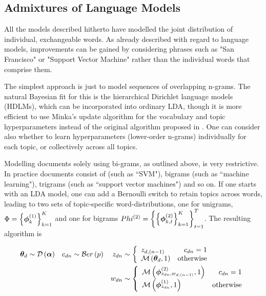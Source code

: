 \subsection*{Admixtures of Language Models}
All the models described hitherto have modelled the joint distribution of individual, exchangeable words. As already described with regard to language models, improvements can be gained by considering phrases such as "San Francisco" or "Support Vector Machine" rather than the individual words that comprise them.

The simplest approach is just to model sequences of overlapping n-grams. The natural Bayesian fit for this is the hierarchical Dirichlet language models (HDLMs), which can be incorporated into ordinary LDA\cite{Wallach2006}, though it is more efficient to use  Minka's update algorithm\cite{Minka2002} for the vocabulary and topic hyperparameters instead of the original algorithm proposed in \cite{MacKay1995}. One can consider also whether to learn hyperparameters (lower-order n-grams) individually for each topic, or collectively across all topics. 

Modelling documents solely using bi-grams, as outlined above, is very restrictive. In practice documents consist of (such as ``SVM"), bigrams (such as ``machine learning"), trigrams (such as ``support vector machines") and so on. If one starts with an LDA model, one can add a Bernoulli switch to retain topics across words, leading to two sets of topic-specific word-distributions, one for unigrams, $\Phi = \left\{ \bm \phi_k^{(1)} \right\}_{k=1}^K$ and one for bigrams $Phi^{(2)} = \left\{\left\{ \bm \phi_{k,t}^{(2)} \right\}_{k=1}^K\right\}_{t=1}^T$. The resulting algorithm is\cite{Wang2007}

\begin{align*}
{  \bm \theta _d } & \sim \mathcal{D} \left( {\bm \alpha} \right) &
c_{dn} & \sim \mathcal{B}er \left( p \right) &
z_{dn} & \sim \left\{
    \begin{array}{lr}
        z_{d,(n-1)} & c_{dn} = 1 \\
        \mathcal{M} \left( {{ \bm \theta_d }},{1} \right) & \text{otherwise}
    \end{array}
\right. \\
& &
& &
w_{dn} & \sim \left\{
    \begin{array}{lr}
        \mathcal{M} \left( {\bm \phi_{z_{dn},w_{d,(n-1)}}^{(2)}},{1} \right) & c_{dn} = 1 \\
        \mathcal{M} \left( {\bm \phi_{z_{dn}}^{(1)}},{1} \right) & \text{otherwise}
    \end{array}
\right.
\end{align*}


